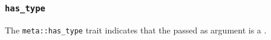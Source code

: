 
\subsubsection{\texttt{has\_type}}

The \texttt{meta::has\_type}
trait indicates that the  passed as argument is a .



